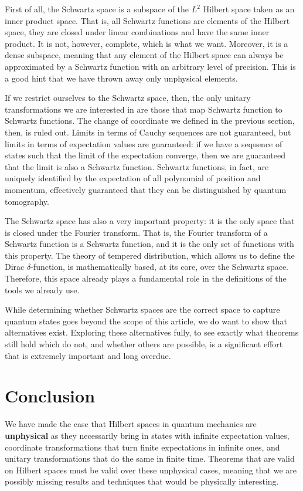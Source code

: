 \documentclass[10pt,twocolumn, nofootinbib]{revtex4-2}
\begin{document}
First of all, the Schwartz space is a subspace of the $L^2$ Hilbert space taken as an inner product space. That is, all Schwartz functions are elements of the Hilbert space, they are closed under linear combinations and have the same inner product. It is not, however, complete, which is what we want. Moreover, it is a dense subspace, meaning that any element of the Hilbert space can always be approximated by a Schwartz function with an arbitrary level of precision. This is a good hint that we have thrown away only unphysical elements.

If we restrict ourselves to the Schwartz space, then, the only unitary transformations we are interested in are those that map Schwartz function to Schwartz functions. The change of coordinate we defined in the previous section, then, is ruled out. Limits in terms of Cauchy sequences are not guaranteed, but limits in terms of expectation values are guaranteed: if we have a sequence of states such that the limit of the expectation converge, then we are guaranteed that the limit is also a Schwartz function. Schwartz functions, in fact, are uniquely identified by the expectation of all polynomial of position and momentum, effectively guaranteed that they can be distinguished by quantum tomography.

The Schwartz space has also a very important property: it is the only space that is closed under the Fourier transform. That is, the Fourier transform of a Schwartz function is a Schwartz function, and it is the only set of functions with this property. The theory of tempered distribution, which allows us to define the Dirac $\delta$-function, is mathematically based, at its core, over the Schwartz space. Therefore, this space already plays a fundamental role in the definitions of the tools we already use.

While determining whether Schwartz spaces are the correct space to capture quantum states goes beyond the scope of this article, we do want to show that alternatives exist. Exploring these alternatives fully, to see exactly what theorems still hold which do not, and whether others are possible, is a significant effort that is extremely important and long overdue.

\section{Conclusion}

We have made the case that Hilbert spaces in quantum mechanics are \textbf{unphysical} as they necessarily bring in states with infinite expectation values, coordinate transformations that turn finite expectations in infinite ones, and unitary transformations that do the same in finite time. Theorems that are valid on Hilbert spaces must be valid over these unphysical cases, meaning that we are possibly missing results and techniques that would be physically interesting.
\end{document}
